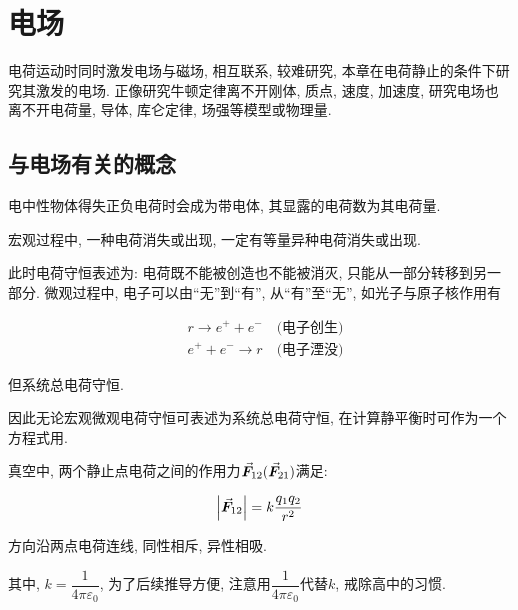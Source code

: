 \chapter{电场}

\begin{introduction}
	\item {}
	\item {}
	\item {}
	\item {}
	\item {}
\end{introduction}

电荷运动时同时激发电场与磁场, 相互联系, 较难研究, 本章在电荷静止的条件下研究其激发的电场. 正像研究牛顿定律离不开刚体, 质点, 速度, 加速度, 研究电场也离不开电荷量, 导体, 库仑定律, 场强等模型或物理量. 

\section{与电场有关的概念}\label{7.1}

\begin{definition}[电荷量]
	电中性物体得失正负电荷时会成为带电体, 其显露的电荷数为其电荷量. 
\end{definition}

\begin{axiom}[电荷守恒]
	宏观过程中, 一种电荷消失或出现, 一定有等量异种电荷消失或出现. 
	
	此时电荷守恒表述为: 电荷既不能被创造也不能被消灭, 只能从一部分转移到另一部分. 微观过程中, 电子可以由“无”到“有”, 从“有”至“无”, 如光子与原子核作用有
	
	\begin{align*}
		&r \rightarrow e^{+} + e^{-} \quad \text{(电子创生)} \\
		&e^{+} + e^{-} \rightarrow r \quad \text{(电子湮没)}
	\end{align*}
	
	但系统总电荷守恒. 
	
	因此无论宏观微观电荷守恒可表述为系统总电荷守恒, 在计算静平衡时可作为一个方程式用. 
\end{axiom}

\begin{axiom}[库仑定律]
	真空中, 两个静止点电荷之间的作用力$\va*{F}_{12}(\va*{F}_{21})$满足: 
	
	\begin{equation}
		\abs{\va*{F}_{12}} = k \dfrac{q_1 q_2}{r^2} \label{C7-eq1}
	\end{equation}
	
	方向沿两点电荷连线, 同性相斥, 异性相吸. 
	
	\vskip 0.2cm
	
	其中, $k = \dfrac{1}{4\pi \varepsilon_0}$, 为了后续推导方便, 注意用$\dfrac{1}{4\pi \varepsilon_0}$代替$k$, 戒除高中的习惯. 
	
\end{axiom}

